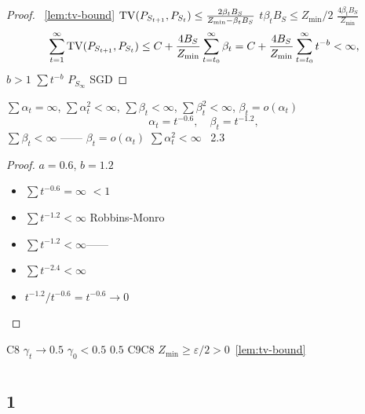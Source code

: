 \begin{proof}
~\ref{lem:tv-bound} $\operatorname{TV}(P_{S_{t+1}}, P_{S_t}) \leq \frac{2\beta_t B_S}{Z_{\min} - \beta_t B_S}$ $t$$\beta_t B_S \leq Z_{\min}/2$ $\frac{4\beta_t B_S}{Z_{\min}}$ 
\begin{equation}
    \sum_{t=1}^\infty \operatorname{TV}(P_{S_{t+1}}, P_{S_t}) \leq C + \frac{4 B_S}{Z_{\min}} \sum_{t=t_0}^\infty \beta_t = C + \frac{4 B_S}{Z_{\min}} \sum_{t=t_0}^\infty t^{-b} < \infty,
\end{equation}
 $b > 1$  $\sum t^{-b}$  $P_{S_\infty}$ SGD 
\end{proof}

\begin{corollary}[]
 $\sum \alpha_t = \infty$, $\sum \alpha_t^2 < \infty$, $\sum \beta_t < \infty$, $\sum \beta_t^2 < \infty$,  $\beta_t = o(\alpha_t)$ 
\begin{equation}
    \alpha_t = t^{-0.6}, \quad \beta_t = t^{-1.2},
\end{equation}
$\sum \beta_t < \infty$ \textbf{}—— $\beta_t = o(\alpha_t)$  $\sum \alpha_t^2 < \infty$ ~2.3 
\end{corollary}

\begin{proof}
 $a = 0.6$, $b = 1.2$
\begin{itemize}[nosep]
    \item $\sum t^{-0.6} = \infty$ $< 1$ 
    \item $\sum t^{-1.2} < \infty$ Robbins-Monro
    \item $\sum t^{-1.2} < \infty$——
    \item $\sum t^{-2.4} < \infty$
    \item $t^{-1.2} / t^{-0.6} = t^{-0.6} \to 0$
\end{itemize}
\end{proof}

\begin{remark}[]
C8 $\gamma_t \to 0.5$ $\gamma_0 < 0.5$ $0.5$ C9C8  $Z_{\min} \geq \varepsilon/2 > 0$~\ref{lem:tv-bound} 
\end{remark}

\section{}\label{sec:failure}



\subsection{ 1}

